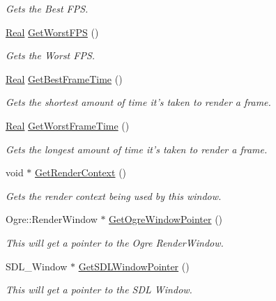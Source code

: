 \begin{DoxyCompactItemize}
\begin{DoxyCompactList}\small\item\em Gets the Best FPS. \item\end{DoxyCompactList}\item 
\hyperlink{namespacephys_af7eb897198d265b8e868f45240230d5f}{Real} \hyperlink{classphys_1_1GameWindow_a26518aba7a4edbc6628d9f777b62bcaa}{GetWorstFPS} ()
\begin{DoxyCompactList}\small\item\em Gets the Worst FPS. \item\end{DoxyCompactList}\item 
\hyperlink{namespacephys_af7eb897198d265b8e868f45240230d5f}{Real} \hyperlink{classphys_1_1GameWindow_a128723e10c8a3ab778b30da38d351fc4}{GetBestFrameTime} ()
\begin{DoxyCompactList}\small\item\em Gets the shortest amount of time it's taken to render a frame. \item\end{DoxyCompactList}\item 
\hyperlink{namespacephys_af7eb897198d265b8e868f45240230d5f}{Real} \hyperlink{classphys_1_1GameWindow_a3e8bcceb201cc2e319fba6b6bf34ee93}{GetWorstFrameTime} ()
\begin{DoxyCompactList}\small\item\em Gets the longest amount of time it's taken to render a frame. \item\end{DoxyCompactList}\item 
void $\ast$ \hyperlink{classphys_1_1GameWindow_ad2d4163536db5b6e61147c5acf3d5b4f}{GetRenderContext} ()
\begin{DoxyCompactList}\small\item\em Gets the render context being used by this window. \item\end{DoxyCompactList}\item 
Ogre::RenderWindow $\ast$ \hyperlink{classphys_1_1GameWindow_ad94dbdf063bd5dd9a285a7803928aede}{GetOgreWindowPointer} ()
\begin{DoxyCompactList}\small\item\em This will get a pointer to the Ogre RenderWindow. \item\end{DoxyCompactList}\item 
SDL\_\-Window $\ast$ \hyperlink{classphys_1_1GameWindow_aefddde0d6790e9e71687310b0328b043}{GetSDLWindowPointer} ()
\begin{DoxyCompactList}\small\item\em This will get a pointer to the SDL Window. \item\end{DoxyCompactList}\end{DoxyCompactItemize}
